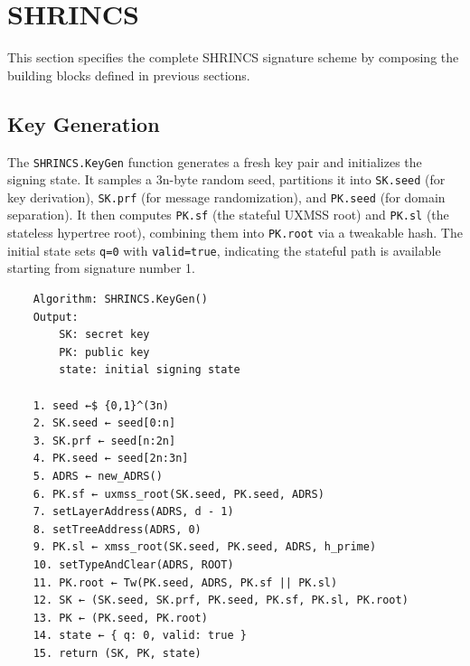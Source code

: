 \section{SHRINCS}
This section specifies the complete SHRINCS signature scheme by composing the building blocks defined in previous sections.

\subsection{Key Generation}
The \texttt{SHRINCS.KeyGen} function generates a fresh key pair and initializes the signing state. It samples a 3n-byte random seed, partitions it into \texttt{SK.seed} (for key derivation), \texttt{SK.prf} (for message randomization), and \texttt{PK.seed} (for domain separation). It then computes \texttt{PK.sf} (the stateful UXMSS root) and \texttt{PK.sl} (the stateless hypertree root), combining them into \texttt{PK.root} via a tweakable hash. The initial state sets \texttt{q=0} with \texttt{valid=true}, indicating the stateful path is available starting from signature number 1.

\begin{verbatim}
    Algorithm: SHRINCS.KeyGen()
    Output:
        SK: secret key
        PK: public key
        state: initial signing state

    1. seed ←$ {0,1}^(3n)
    2. SK.seed ← seed[0:n]
    3. SK.prf ← seed[n:2n]
    4. PK.seed ← seed[2n:3n]
    5. ADRS ← new_ADRS()
    6. PK.sf ← uxmss_root(SK.seed, PK.seed, ADRS)
    7. setLayerAddress(ADRS, d - 1)
    8. setTreeAddress(ADRS, 0)
    9. PK.sl ← xmss_root(SK.seed, PK.seed, ADRS, h_prime)
    10. setTypeAndClear(ADRS, ROOT)
    11. PK.root ← Tw(PK.seed, ADRS, PK.sf || PK.sl)
    12. SK ← (SK.seed, SK.prf, PK.seed, PK.sf, PK.sl, PK.root)
    13. PK ← (PK.seed, PK.root)
    14. state ← { q: 0, valid: true }
    15. return (SK, PK, state)
\end{verbatim}

